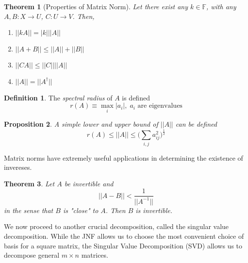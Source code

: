 \documentclass{article}
\newtheorem{theorem}{Theorem}[section]
\newtheorem{proposition}[theorem]{Proposition}
\theoremstyle{remark}
\theoremstyle{definition}
\newtheorem{definition}{Definition}[section]
\begin{document}
    \begin{theorem}[Properties of Matrix Norm]
    Let there exist any $k \in \mathbb{F}$, with any $A, B: X \longrightarrow U$, $C: U \longrightarrow V$. Then, 
    \begin{enumerate}
        \item $||k A|| = |k| ||A||$
        \item $||A + B|| \leq ||A|| + ||B||$
        \item $||C A|| \leq ||C|| ||A||$
        \item $||A|| = ||A^\dagger||$
    \end{enumerate}
    \end{theorem}

    \begin{definition}
    The \textit{spectral radius} of $A$ is defined
    \[r(A) \equiv \max_i |a_i|, \; a_i \text{ are eigenvalues}\]
    \end{definition}

    \begin{proposition}
    A simple lower and upper bound of $||A||$ can be defined
    \[ r(A) \leq ||A|| \leq \bigg( \sum_{i, j} a_{i j}^2 \bigg)^\frac{1}{2}\]
    \end{proposition}

    Matrix norms have extremely useful applications in determining the existence of invereses. 

    \begin{theorem}
    Let $A$ be invertible and 
    \[||A - B|| < \frac{1}{||A^{-1}||}\]
    in the sense that $B$ is "close" to $A$. Then $B$ is invertible. 
    \end{theorem}
    We now proceed to another crucial decomposition, called the singular value decomposition. While the JNF allows us to choose the most convenient choice of basis for a square matrix, the Singular Value Decomposition (SVD) allows us to decompose general $m \times n$ matrices. 
\end{document}
